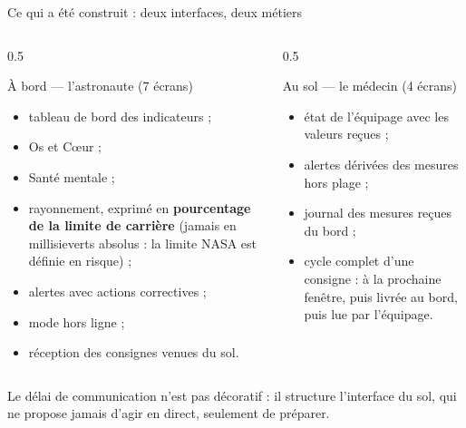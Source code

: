 \documentclass[aspectratio=169,11pt]{beamer}
\begin{document}
\begin{frame}{Ce qui a \'et\'e construit : deux interfaces, deux m\'etiers}
\begin{columns}[t]
\begin{column}{0.5\textwidth}
\begin{block}{\`A bord --- l'astronaute (7 \'ecrans)}
\footnotesize
\begin{itemize}
  \item tableau de bord des indicateurs ;
  \item Os et C\oe{}ur ;
  \item Sant\'e mentale ;
  \item rayonnement, exprim\'e en \textbf{pourcentage de la limite de carri\`ere} (jamais en millisieverts absolus : la limite NASA est d\'efinie en risque) ;
  \item alertes avec actions correctives ;
  \item mode hors ligne ;
  \item r\'eception des consignes venues du sol.
\end{itemize}
\end{block}
\end{column}
\begin{column}{0.5\textwidth}
\begin{block}{Au sol --- le m\'edecin (4 \'ecrans)}
\footnotesize
\begin{itemize}
  \item \'etat de l'\'equipage avec les valeurs re\c{c}ues ;
  \item alertes d\'eriv\'ees des mesures hors plage ;
  \item journal des mesures re\c{c}ues du bord ;
  \item cycle complet d'une consigne : \`a la prochaine fen\^etre, puis livr\'ee au bord, puis lue par l'\'equipage.
\end{itemize}
\end{block}
\end{column}
\end{columns}
\vspace{0.05cm}
{\color{cyanH}\footnotesize Le d\'elai de communication n'est pas d\'ecoratif : il structure l'interface du sol, qui ne propose jamais d'agir en direct, seulement de pr\'eparer.}
\end{frame}
\end{document}
